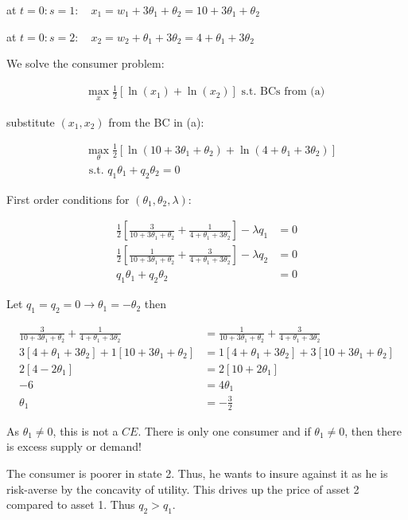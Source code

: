 {\begin{enumerate}[label=(\alph*)]
{at $t=0: s=1: \quad x_1=w_1+3 \theta_1+\theta_2=10+3 \theta_1+\theta_2$

at $t=0: s=2: \quad x_2=w_2+ \theta_1+3\theta_2=4+\theta_1+3\theta_2$
}
{\item
We solve the consumer problem:

\begin{align*}
    \max _x \frac{1}{2}\left[\ln \left(x_1\right)+\ln \left(x_2\right)\right] \text { s.t. BCs from (a) }
\end{align*}

substitute $(x_1, x_2)$ from the BC in (a):

\begin{align*}
    &\max _\theta \frac{1}{2}\left[\ln \left(10+3 \theta_1+\theta_2\right)+\ln \left(4+\theta_1+3 \theta_2\right)\right] \\
    &\text { s.t. } q_1 \theta_1+q_2 \theta_2=0
\end{align*}

First order conditions for $(\theta_1, \theta_2, \lambda)$:

\begin{align*}
    \frac{1}{2}\left[\frac{3}{10+3 \theta_1+\theta_2}+\frac{1}{4+\theta_1+3 \theta_2}\right]-\lambda q_1 &= 0 \\
    \frac{1}{2}\left[\frac{1}{10+3 \theta_1+\theta_2}+\frac{3}{4+\theta_1+3 \theta_2}\right]-\lambda q_2 &= 0 \\
    q_1 \theta_1+q_2 \theta_2 &= 0
\end{align*}

Let $q_1=q_2=0 \rightarrow \theta_1=-\theta_2$ then

\begin{align*}
    \frac{3}{10+3 \theta_1+\theta_2}+\frac{1}{4+\theta_1+3 \theta_2} &= \frac{1}{10+3 \theta_1+\theta_2}+\frac{3}{4+\theta_1+3 \theta_2} \\
    3 \left[4+\theta_1+3 \theta_2\right] + 1 \left[10+3 \theta_1+\theta_2\right] &= 1 \left[ 4+\theta_1+3 \theta_2 \right] + 3 \left[ 10+3 \theta_1+\theta_2 \right] \\
    2\left[4-2 \theta_1\right] & =2\left[10+2 \theta_1\right] \\ -6 & =4 \theta_1 \\ \theta_1 & =-\frac{3}{2}
\end{align*}

As $\theta_1 \neq 0$, this is not a $C E$. There is only one consumer and if $\theta_1 \neq 0$, then there is excess supply or demand!
}
{\item
The consumer is poorer in state 2. Thus, he wants to insure against it as he is risk-averse by the concavity of utility. This drives up the price of asset 2 compared to asset 1. Thus $q_2>q_1$.
}
\end{enumerate}
}